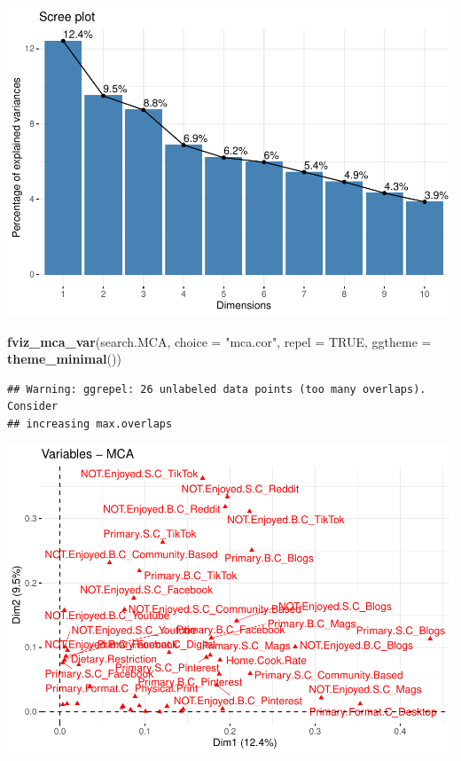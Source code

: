 \documentclass[
]{article}
\newenvironment{Shaded}{\begin{snugshade}}{\end{snugshade}}
\newcommand{\DataTypeTok}[1]{\textcolor[rgb]{0.13,0.29,0.53}{#1}}
\newcommand{\KeywordTok}[1]{\textcolor[rgb]{0.13,0.29,0.53}{\textbf{#1}}}
\newcommand{\NormalTok}[1]{#1}
\newcommand{\OtherTok}[1]{\textcolor[rgb]{0.56,0.35,0.01}{#1}}
\newcommand{\StringTok}[1]{\textcolor[rgb]{0.31,0.60,0.02}{#1}}
\begin{document}
\includegraphics{Average-User-MCA_files/figure-latex/mca not enjoyed all-1.pdf}

\begin{Shaded}
\begin{Highlighting}[]
\KeywordTok{fviz_mca_var}\NormalTok{(search.MCA, }\DataTypeTok{choice =} \StringTok{"mca.cor"}\NormalTok{, }\DataTypeTok{repel =} \OtherTok{TRUE}\NormalTok{,}
             \DataTypeTok{ggtheme =} \KeywordTok{theme_minimal}\NormalTok{())}
\end{Highlighting}
\end{Shaded}

\begin{verbatim}
## Warning: ggrepel: 26 unlabeled data points (too many overlaps). Consider
## increasing max.overlaps
\end{verbatim}

\includegraphics{Average-User-MCA_files/figure-latex/mca not enjoyed all-2.pdf}
\end{document}
